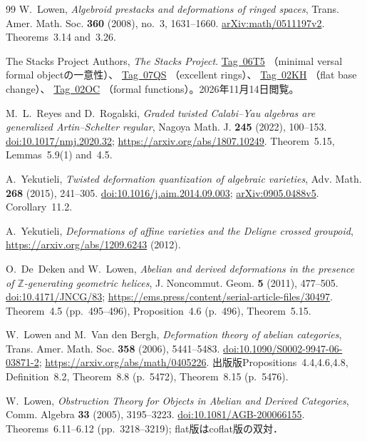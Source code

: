 \documentclass[11pt,a4paper]{ltjsarticle}
\numberwithin{equation}{section}
\begin{document}
\begin{thebibliography}{99}
W.~Lowen,
\emph{Algebroid prestacks and deformations of ringed spaces},
Trans. Amer. Math. Soc. \textbf{360} (2008), no.~3, 1631--1660.
\href{https://arxiv.org/abs/math/0511197}{arXiv:math/0511197v2}.
Theorems~3.14 and~3.26.

The Stacks Project Authors,
\emph{The Stacks Project}.
\href{https://stacks.math.columbia.edu/tag/06T5}{Tag~06T5}
（minimal versal formal objectの一意性）、
\href{https://stacks.math.columbia.edu/tag/07QS}{Tag~07QS}
（excellent rings）、
\href{https://stacks.math.columbia.edu/tag/02KH}{Tag~02KH}
（flat base change）、
\href{https://stacks.math.columbia.edu/tag/02OC}{Tag~02OC}
（formal functions）。2026年11月14日閲覧。

M.~L.~Reyes and D.~Rogalski,
\emph{Graded twisted Calabi--Yau algebras are generalized Artin--Schelter regular},
Nagoya Math. J. \textbf{245} (2022), 100--153.
\href{https://doi.org/10.1017/nmj.2020.32}{doi:10.1017/nmj.2020.32};
\url{https://arxiv.org/abs/1807.10249}.
Theorem~5.15, Lemmas~5.9(1) and~4.5.

A.~Yekutieli,
\emph{Twisted deformation quantization of algebraic varieties},
Adv. Math. \textbf{268} (2015), 241--305.
\href{https://doi.org/10.1016/j.aim.2014.09.003}{doi:10.1016/j.aim.2014.09.003};
\href{https://arxiv.org/abs/0905.0488v5}{arXiv:0905.0488v5}.
Corollary~11.2.

A.~Yekutieli,
\emph{Deformations of affine varieties and the Deligne crossed groupoid},
\url{https://arxiv.org/abs/1209.6243} (2012).

O.~De~Deken and W.~Lowen,
\emph{Abelian and derived deformations in the presence of
$\mathbb Z$-generating geometric helices},
J. Noncommut. Geom. \textbf{5} (2011), 477--505.
\href{https://doi.org/10.4171/JNCG/83}{doi:10.4171/JNCG/83};
\url{https://ems.press/content/serial-article-files/30497}.
Theorem~4.5 (pp.~495--496), Proposition~4.6 (p.~496), Theorem~5.15.

W.~Lowen and M.~Van den Bergh,
\emph{Deformation theory of abelian categories},
Trans. Amer. Math. Soc. \textbf{358} (2006), 5441--5483.
\href{https://doi.org/10.1090/S0002-9947-06-03871-2}{doi:10.1090/S0002-9947-06-03871-2};
\url{https://arxiv.org/abs/math/0405226}.
出版版Propositions~4.4,4.6,4.8, Definition~8.2,
Theorem~8.8 (p.~5472), Theorem~8.15 (p.~5476).

W.~Lowen,
\emph{Obstruction Theory for Objects in Abelian and Derived Categories},
Comm. Algebra \textbf{33} (2005), 3195--3223.
\href{https://doi.org/10.1081/AGB-200066155}{doi:10.1081/AGB-200066155}.
Theorems~6.11--6.12 (pp.~3218--3219); flat版はcoflat版の双対．


\end{thebibliography}
\end{document}
